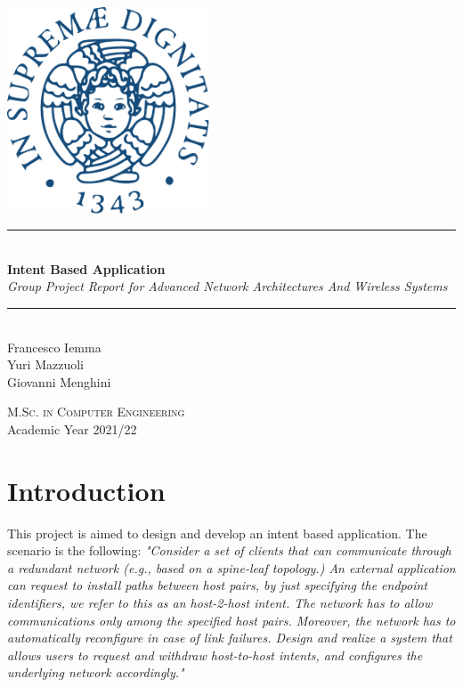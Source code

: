 \documentclass[a4paper]{report}
\newcommand{\HRule}{\rule{\linewidth}{0.5mm}}
\begin{document}
	\begin{titlepage}
		\begin{center}
			
			\includegraphics[width=0.45\textwidth]{img/unipi.png}~\\[2.5cm]
			
			
			\HRule \\[0.4cm]
			{ \LARGE 
				\textbf{Intent Based Application}\\[0.4cm]
				\emph{Group Project Report for Advanced Network Architectures And Wireless Systems}\\[0.4cm]
			}
			\HRule \\[1.5cm]
			
			
			
			{ \large
				Francesco Iemma \\[0.1cm]
				Yuri Mazzuoli \\[0.1cm]
				Giovanni Menghini \\[0.1cm]
			}
			
			\vfill
			
			\textsc{\large M.Sc. in Computer Engineering}\\[0.4cm]
			
			
			{\large Academic Year 2021/22}
			
		\end{center}
	\end{titlepage}
	
	
	\tableofcontents
	\newpage
	
	\chapter*{Introduction}
	This project is aimed to design and develop an intent based application. The scenario is the following: \textit{"Consider a set of clients that can communicate through a redundant network
	(e.g., based on a spine-leaf topology.) An external application can request to install paths
	between host pairs, by just specifying the endpoint identifiers, we refer to this as an
	host-2-host intent. The network has to allow communications only among the specified host
	pairs. Moreover, the network has to automatically reconfigure in case of link failures.
	Design and realize a system that allows users to request and withdraw host-to-host intents,
	and configures the underlying network accordingly."}
\end{document}
